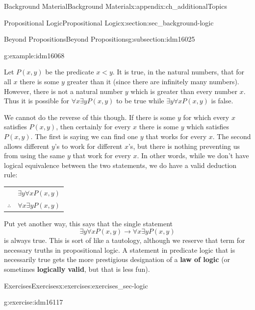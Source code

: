 \documentclass[oneside,10pt,]{book}
\newcommand{\terminology}[1]{\textbf{#1}}
\numberwithin{equation}{chapter}
\newcommand{\hrulethin}  {\noalign{\hrule height 0.04em}}
\def\imp{\rightarrow}
\newcommand{\lt}{<}
\begin{document}
\begin{appendixptx}{Background Material}{}{Background Material}{}{}{x:appendix:ch_additionalTopics}
\begin{sectionptx}{Propositional Logic}{}{Propositional Logic}{}{}{x:section:sec_background-logic}
\begin{subsectionptx}{Beyond Propositions}{}{Beyond Propositions}{}{}{g:subsection:idm16025}
\begin{example}{}{g:example:idm16068}
\par
Let \(P(x,y)\) be the predicate \(x \lt  y\). It is true, in the natural numbers, that for all \(x\) there is some \(y\) greater than it (since there are infinitely many numbers). However, there is not a natural number \(y\) which is greater than every number \(x\).  Thus it is possible for \(\forall x \exists y P(x,y)\) to be true while \(\exists y \forall x P(x,y)\) is false.%
\par
We cannot do the reverse of this though. If there is some \(y\) for which every \(x\) satisfies \(P(x,y)\), then certainly for every \(x\) there is some \(y\) which satisfies \(P(x,y)\). The first is saying we can find one \(y\) that works for every \(x\). The second allows different \(y\)'s to work for different \(x\)'s, but there is nothing preventing us from using the same \(y\) that work for every \(x\).  In other words, while we don't have logical equivalence between the two statements, we do have a valid deduction rule:%
\begin{sidebyside}{1}{0}{0}{0}%
\begin{sbspanel}{1}%
{\centering%
\begin{tabular}{cc}
&\(\exists y \forall x P(x,y)\)\tabularnewline\hrulethin
\(\therefore\)&\(\forall x \exists y P(x,y)\)
\end{tabular}
\par}
\end{sbspanel}%
\end{sidebyside}%
\par
Put yet another way, this says that the single statement%
\begin{equation*}
\exists y \forall x P(x,y) \imp \forall x \exists y P(x,y)
\end{equation*}
is always true.  This is sort of like a tautology, although we reserve that term for necessary truths in propositional logic.  A statement in predicate logic that is necessarily true gets the more prestigious designation of a \terminology{law of logic} (or sometimes \terminology{logically valid}, but that is less fun).%
\end{example}
\end{subsectionptx}
%
%
\typeout{************************************************}
\typeout{************************************************}
%
\begin{exercises-subsection}{Exercises}{}{Exercises}{}{}{x:exercises:exercises_sec-logic}
\begin{divisionexercise}{1}{}{}{g:exercise:idm16117}%

\end{divisionexercise}
\end{exercises-subsection}
\end{sectionptx}
\end{appendixptx}
\end{document}

